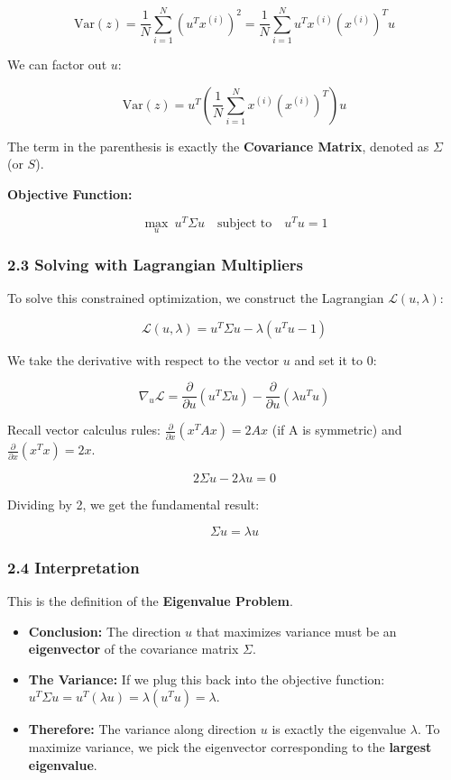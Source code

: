 \documentclass[
  italian,
  11pt,
]{article}
\begin{document}
\[\text{Var}(z) = \frac{1}{N} \sum_{i=1}^N (u^T x^{(i)})^2 = \frac{1}{N} \sum_{i=1}^N u^T x^{(i)} (x^{(i)})^T u\]

We can factor out \(u\):

\[\text{Var}(z) = u^T \left( \frac{1}{N} \sum_{i=1}^N x^{(i)} (x^{(i)})^T \right) u\]

The term in the parenthesis is exactly the \textbf{Covariance Matrix},
denoted as \(\Sigma\) (or \(S\)).

\textbf{Objective Function:}

\[\max_u \ u^T \Sigma u \quad \text{subject to} \quad u^T u = 1\]

\subsubsection{2.3 Solving with Lagrangian
Multipliers}\label{solving-with-lagrangian-multipliers}

To solve this constrained optimization, we construct the Lagrangian
\(\mathcal{L}(u, \lambda)\):

\[\mathcal{L}(u, \lambda) = u^T \Sigma u - \lambda (u^T u - 1)\]

We take the derivative with respect to the vector \(u\) and set it to 0:

\[\nabla_u \mathcal{L} = \frac{\partial}{\partial u} (u^T \Sigma u) - \frac{\partial}{\partial u} (\lambda u^T u)\]

Recall vector calculus rules:
\(\frac{\partial}{\partial x} (x^T A x) = 2Ax\) (if A is symmetric) and
\(\frac{\partial}{\partial x} (x^T x) = 2x\).

\[2 \Sigma u - 2 \lambda u = 0\]

Dividing by 2, we get the fundamental result:

\[\Sigma u = \lambda u\]

\subsubsection{2.4 Interpretation}\label{interpretation-1}

This is the definition of the \textbf{Eigenvalue Problem}.

\begin{itemize}
\item
  \textbf{Conclusion:} The direction \(u\) that maximizes variance must
  be an \textbf{eigenvector} of the covariance matrix \(\Sigma\).
\item
  \textbf{The Variance:} If we plug this back into the objective
  function:
  \(u^T \Sigma u = u^T (\lambda u) = \lambda (u^T u) = \lambda\).
\item
  \textbf{Therefore:} The variance along direction \(u\) is exactly the
  eigenvalue \(\lambda\). To maximize variance, we pick the eigenvector
  corresponding to the \textbf{largest eigenvalue}.
\end{itemize}
\end{document}
